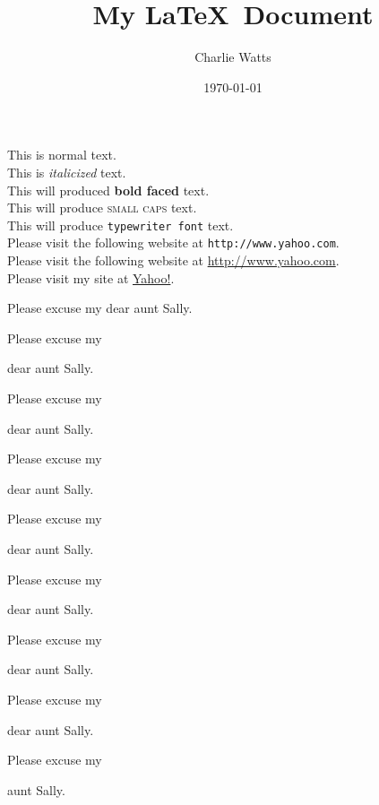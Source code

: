 \documentclass[11pt]{article}
\title{My \LaTeX\ Document}
\author{Charlie Watts}
\date{\today}
\begin{document}
\tableofcontents
\maketitle

This is normal text.\\
This is \textit{italicized} text.\\
This will produced \textbf{bold faced} text.\\
This will produce \textsc{small caps} text.\\
This will produce \texttt{typewriter font} text.\\

Please visit the following website at \texttt{http://www.yahoo.com}.\\
Please visit the following website at \url{http://www.yahoo.com}.\\
Please visit my site at \href{https://www.yahoo.com}{Yahoo!}.\\

\vspace{0.5 cm}

Please excuse my dear aunt Sally.

Please excuse my \begin{large}dear aunt Sally.
\end{large}

Please excuse my \begin{Large}dear aunt Sally.
\end{Large}

Please excuse my \begin{huge}dear aunt Sally.
\end{huge}

Please excuse my \begin{Huge}dear aunt Sally.
\end{Huge}

Please excuse my \begin{normalsize}dear aunt Sally.
\end{normalsize}

Please excuse my \begin{small}dear aunt Sally.
\end{small}

Please excuse my \begin{scriptsize}dear aunt Sally.
\end{scriptsize}

Please excuse my \begin{tiny} aunt Sally.
\end{tiny}
\end{document}
